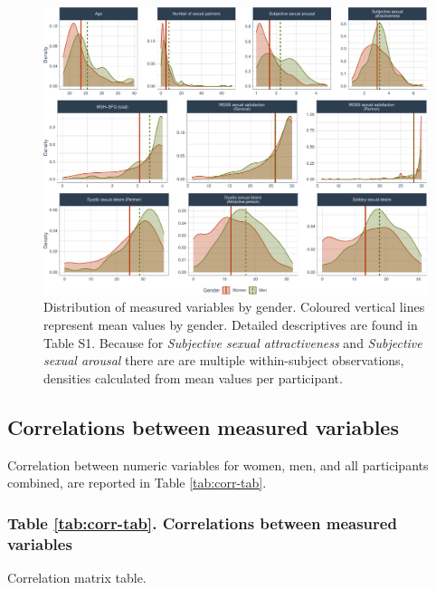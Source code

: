 \documentclass[
  bookmarksnumbered]{article}
\begin{document}
\begin{figure}
\centering
\includegraphics{Sexual_Desire_Arousal_files/figure-latex/density-plot-1.pdf}
\caption{\label{fig:density-plot}Distribution of measured variables by gender. Coloured vertical lines represent mean values by gender. Detailed descriptives are found in Table S1. Because for \emph{Subjective sexual attractiveness} and \emph{Subjective sexual arousal} there are are multiple within-subject observations, densities calculated from mean values per participant.}
\end{figure}

\hypertarget{correlations-between-measured-variables}{%
\subsection{Correlations between measured variables}\label{correlations-between-measured-variables}}

Correlation between numeric variables for women, men, and all participants combined, are reported in Table \ref{tab:corr-tab}.

\hypertarget{table-reftabcorr-tab.-correlations-between-measured-variables}{%
\subsubsection{Table \ref{tab:corr-tab}. Correlations between measured variables}\label{table-reftabcorr-tab.-correlations-between-measured-variables}}

Correlation matrix table.
\end{document}
